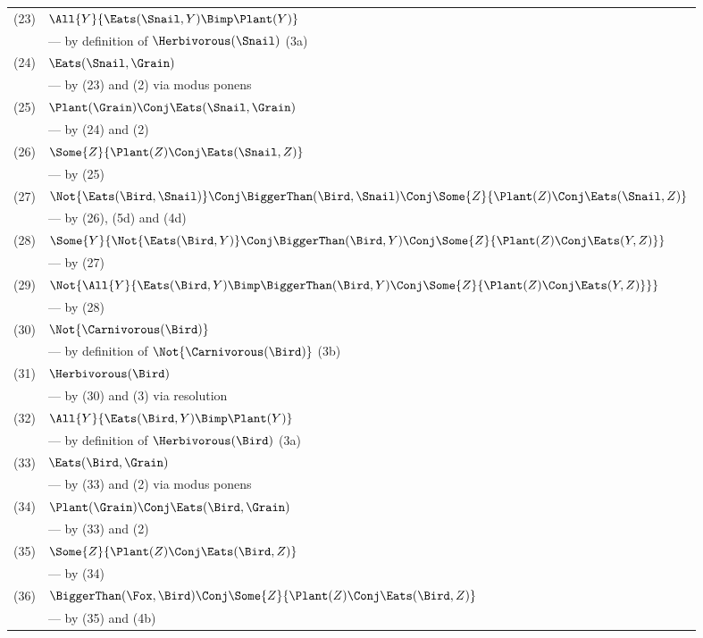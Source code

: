 \begin{itemize}
\begin{tabular}{rl}
(23) & $\All{Y}{\Eats(\Snail, Y) \Bimp \Plant(Y)}$
\\ & --- by definition of $\Herbivorous(\Snail)$ (3a) \\
(24) & $\Eats(\Snail, \Grain)$
\\ & --- by (23) and (2) via modus ponens \\
(25) & $\Plant(\Grain) \Conj \Eats(\Snail, \Grain)$
\\ & --- by (24) and (2) \\
(26) & $\Some{Z}{\Plant(Z) \Conj \Eats(\Snail, Z)}$
\\ & --- by (25) \\
(27) & $\Not{\Eats(\Bird, \Snail)} \Conj
        \BiggerThan(\Bird, \Snail) \Conj
        \Some{Z}{\Plant(Z) \Conj \Eats(\Snail, Z)}$
\\ & --- by (26), (5d) and (4d) \\
(28) & $\Some{Y}{
            \Not{\Eats(\Bird, Y)} \Conj
            \BiggerThan(\Bird, Y) \Conj
            \Some{Z}{\Plant(Z) \Conj \Eats(Y, Z)}}$
\\ & --- by (27) \\
(29) & $\Not{\All{Y}{
            \Eats(\Bird, Y) \Bimp
            \BiggerThan(\Bird, Y) \Conj
            \Some{Z}{\Plant(Z) \Conj \Eats(Y, Z)}}}$
\\ & --- by (28) \\
(30) & $\Not{\Carnivorous(\Bird)}$
\\ & --- by definition of $\Not{\Carnivorous(\Bird)}$ (3b) \\
(31) & $\Herbivorous(\Bird)$
\\ & --- by (30) and (3) via resolution \\
(32) & $\All{Y}{\Eats(\Bird, Y) \Bimp \Plant(Y)}$
\\ & --- by definition of $\Herbivorous(\Bird)$ (3a) \\
(33) & $\Eats(\Bird, \Grain)$
\\ & --- by (33) and (2) via modus ponens \\
(34) & $\Plant(\Grain) \Conj \Eats(\Bird, \Grain)$
\\ & --- by (33) and (2) \\
(35) & $\Some{Z}{\Plant(Z) \Conj \Eats(\Bird, Z)}$
\\ & --- by (34) \\
(36) & $\BiggerThan(\Fox, \Bird) \Conj
        \Some{Z}{\Plant(Z) \Conj \Eats(\Bird, Z)}$
\\ & --- by (35) and (4b) \\

\end{tabular}
\end{itemize}
